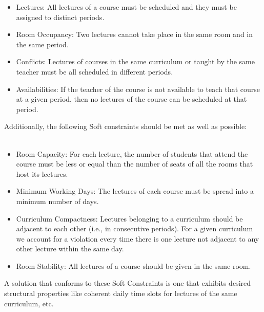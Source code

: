 \begin{itemize}
\item Lectures: All lectures of a course must be scheduled and they must be assigned to distinct periods. 
\item Room Occupancy: Two lectures cannot take place in the same room and in the same period. 
\item Conflicts: Lectures of courses in the same curriculum or taught by the same teacher must be all scheduled in different periods.
\item Availabilities: If the teacher of the course is not available to teach that course at a given period, then no lectures of the course can be scheduled at that period.
\end{itemize}
Additionally, the following Soft constraints should be met as well as possible:\\
\\
\begin{itemize}
\item Room Capacity: For each lecture, the number of students that attend the course must be less or equal than the number of seats of all the rooms that host its lectures. 
\item Minimum Working Days: The lectures of each course must be spread into a minimum number of days. 
\item Curriculum Compactness: Lectures belonging to a curriculum should be adjacent to each other (i.e., in consecutive periods). For a given curriculum we account for a violation every time there is one lecture not adjacent to any other lecture within the same day. 
\item Room Stability: All lectures of a course should be given in the same room. 
\end{itemize}
A solution that conforms to these Soft Constraints is one that exhibits desired structural properties like coherent daily time slots for lectures of the same curriculum, etc.